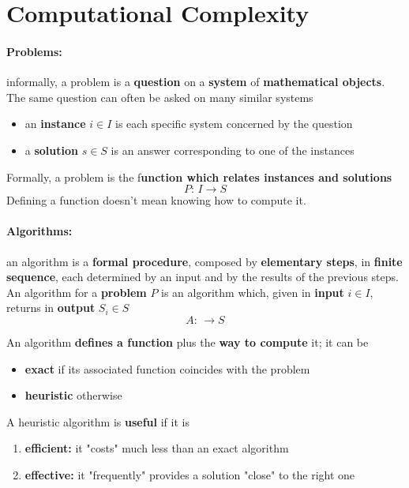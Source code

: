 \documentclass[11pt]{article}
\begin{document}
	
	\newpage
	
	\section{Computational Complexity}
	\paragraph{Problems:} informally, a problem is a \textbf{question} on a \textbf{system} of \textbf{mathematical objects}. The same question can often be asked on many similar systems
	\begin{itemize}
		\item an \textbf{instance} $i \in I$ is each specific system concerned by the question 
		\item a \textbf{solution} $s \in S$ is an answer corresponding to one of the instances
	\end{itemize}
	Formally, a problem is the f\textbf{unction which relates instances and solutions}
	$$ P : \, I \rightarrow S $$
	Defining a function doesn't mean knowing how to compute it.\\
	
	\paragraph{Algorithms:} an algorithm is a \textbf{formal procedure}, composed by \textbf{elementary steps}, in \textbf{finite sequence}, each determined by an input and by the results of the previous steps.\\
	
	An algorithm for a \textbf{problem} $P$ is an algorithm which, given in \textbf{input} $i \in I$, returns in \textbf{output} $S_i \in S$
	$$ A : \, \rightarrow S $$
	
	An algorithm \textbf{defines a function} plus the \textbf{way to compute} it; it can be
	\begin{itemize}
		\item \textbf{exact} if its associated function coincides with the problem
		\item \textbf{heuristic} otherwise
	\end{itemize}
	A heuristic algorithm is \textbf{useful} if it is
	\begin{enumerate}
		\item \textbf{efficient:} it "costs" much less than an exact algorithm
		\item \textbf{effective:} it "frequently" provides a solution "close" to the right one
	\end{enumerate}
	
\end{document}

